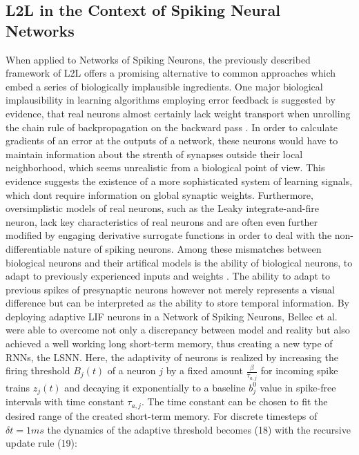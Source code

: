 \documentclass[letterpaper, 10 pt, conference]{ieeeconf}  %
\begin{document}
\subsection{L2L in the Context of Spiking Neural Networks}
When applied to Networks of Spiking Neurons, the previously described framework of L2L offers a promising alternative
to common approaches which embed a series of biologically implausible ingredients. One major biological implausibility
in learning algorithms employing error feedback is suggested by evidence, that real neurons almost certainly lack weight transport
when unrolling the chain rule of backpropagation on the backward pass\cite{samadiDeepLearningDynamic2017}
\cite{chintaAdaptiveOptimalControl2012}\cite{crickRecentExcitementNeural1989}. In order 
to calculate gradients
of an error at the outputs of a network, these neurons would have to maintain information about the strenth of synapses outside their local
neighborhood, which seems unrealistic from a biological point of view. This evidence suggests the existence of a more sophisticated 
system of learning signals, which dont require information on global synaptic weights. Furthermore, oversimplistic models of real
neurons, such as the Leaky integrate-and-fire neuron, lack key characteristics of real neurons and are often even further modified by engaging
derivative surrogate functions in order to deal with the non-differentiable nature of spiking neurons. Among these mismatches between 
biological neurons and their artifical models is the ability of biological neurons, to adapt to previously experienced inputs
and weights \cite{samadiDeepLearningDynamic2017}. The ability to adapt to previous spikes of presynaptic neurons however not merely represents a visual
difference but can be interpreted as the ability to store temporal information. \newline
By deploying adaptive LIF neurons in a Network of Spiking Neurons, Bellec et al.\cite{bellecLongShorttermMemory2018} were able to overcome not only a 
discrepancy between model and reality but also achieved a well working long short-term memory, thus creating a new type of RNNs, the LSNN. 
Here, the adaptivity of neurons is realized by increasing the firing threshold $B_j(t)$ of a neuron $j$
by a fixed amount $\frac{\beta}{\tau_{a,j}}$ for incoming spike trains $z_j(t)$ and decaying it exponentially to a baseline $b^0_j$ value in spike-free intervals 
with time constant $\tau_{a,j}$. The time constant can be chosen to fit the desired range of the created short-term memory. For discrete timesteps
of $\delta t = 1 ms$ the dynamics of the adaptive threshold becomes (18) with the recursive update rule (19):
\end{document}
